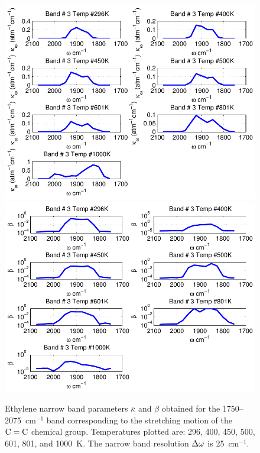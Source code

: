\begin{figure}[p]
\begin{center}
\includegraphics[width=5.0in]{Figures/Ethylene_Kappa_Band3_MALKMUS.pdf}
\includegraphics[width=5.0in]{Figures/Ethylene_Beta_Band3_MALKMUS.pdf}
\end{center}
\caption{Ethylene narrow band parameters $\bar{\kappa}$ and $\beta$ obtained for the 1750--2075~cm$^{-1}$ band corresponding to the stretching motion of the $\rm C=C$ chemical group. Temperatures plotted are: 296, 400, 450, 500, 601, 801, and 1000~K. The narrow band resolution $\Delta \omega$ is 25~cm$^{-1}$.\label{fig:ethylene_kappa_beta3}}
\end{figure}

